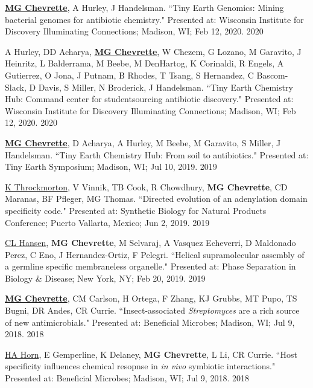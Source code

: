 \begin{cvpubs}

\cvpub
{\underline{\textbf{MG Chevrette}}, A Hurley, J Handelsman. ``Tiny Earth Genomics: Mining bacterial genomes for antibiotic chemistry." Presented at: Wisconsin Institute for Discovery Illuminating Connections; Madison, WI; Feb 12, 2020.}
{2020}

\end{cvpubs} \begin{cvpubs}

\cvpub
{A Hurley, DD Acharya, \underline{\textbf{MG Chevrette}}, W Chezem, G Lozano, M Garavito, J Heinritz, L Balderrama, M Beebe, M DenHartog, K Corinaldi, R Engels, A Gutierrez, O Jona, J Putnam, B Rhodes, T Tsang, S Hernandez, C Bascom-Slack, D Davis, S Miller, N Broderick, J Handelsman. ``Tiny Earth Chemistry Hub: Command center for studentsourcing antibiotic discovery." Presented at: Wisconsin Institute for Discovery Illuminating Connections; Madison, WI; Feb 12, 2020.}
{2020}

\cvpub
{\underline{\textbf{MG Chevrette}}, D Acharya, A Hurley, M Beebe, M Garavito, S Miller, J Handelsman. ``Tiny Earth Chemistry Hub: From soil to antibiotics." Presented at: Tiny Earth Symposium; Madison, WI; Jul 10, 2019.}
{2019}

\cvpub
{\underline{K Throckmorton}, V Vinnik, TB Cook, R Chowdhury, \textbf{MG Chevrette}, CD Maranas, BF Pfleger, MG Thomas. ``Directed evolution of an adenylation domain specificity code." Presented at: Synthetic Biology for Natural Products Conference; Puerto Vallarta, Mexico; Jun 2, 2019.}
{2019}

\cvpub
{\underline{CL Hansen}, \textbf{MG Chevrette}, M Selvaraj, A Vasquez Echeverri, D Maldonado Perez, C Eno, J Hernandez-Ortiz, F Pelegri. ``Helical supramolecular assembly of a germline specific membraneless organelle." Presented at: Phase Separation in Biology \& Disease; New York, NY; Feb 20, 2019.}
{2019}

\cvpub
{\underline{\textbf{MG Chevrette}}, CM Carlson, H Ortega, F Zhang, KJ Grubbs, MT Pupo, TS Bugni, DR Andes, CR Currie. ``Insect-associated \textit{Streptomyces} are a rich source of new antimicrobials." Presented at: Beneficial Microbes; Madison, WI; Jul 9, 2018.}
{2018}

\cvpub
{\underline{HA Horn}, E Gemperline, K Delaney, \textbf{MG Chevrette}, L Li, CR Currie. ``Host specificity influences chemical resopnse in \textit{in vivo} symbiotic interactions." Presented at: Beneficial Microbes; Madison, WI; Jul 9, 2018.}
{2018}


\end{cvpubs}
